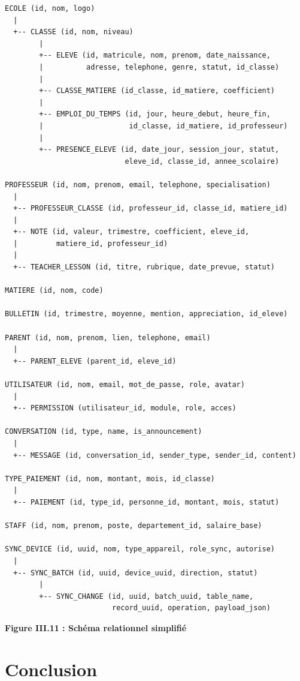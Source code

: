 \documentclass[12pt,a4paper,twoside]{report}
\begin{document}
\begin{verbatim}
ECOLE (id, nom, logo)
  |
  +-- CLASSE (id, nom, niveau)
        |
        +-- ELEVE (id, matricule, nom, prenom, date_naissance,
        |          adresse, telephone, genre, statut, id_classe)
        |
        +-- CLASSE_MATIERE (id_classe, id_matiere, coefficient)
        |
        +-- EMPLOI_DU_TEMPS (id, jour, heure_debut, heure_fin,
        |                    id_classe, id_matiere, id_professeur)
        |
        +-- PRESENCE_ELEVE (id, date_jour, session_jour, statut,
                            eleve_id, classe_id, annee_scolaire)

PROFESSEUR (id, nom, prenom, email, telephone, specialisation)
  |
  +-- PROFESSEUR_CLASSE (id, professeur_id, classe_id, matiere_id)
  |
  +-- NOTE (id, valeur, trimestre, coefficient, eleve_id,
  |         matiere_id, professeur_id)
  |
  +-- TEACHER_LESSON (id, titre, rubrique, date_prevue, statut)

MATIERE (id, nom, code)

BULLETIN (id, trimestre, moyenne, mention, appreciation, id_eleve)

PARENT (id, nom, prenom, lien, telephone, email)
  |
  +-- PARENT_ELEVE (parent_id, eleve_id)

UTILISATEUR (id, nom, email, mot_de_passe, role, avatar)
  |
  +-- PERMISSION (utilisateur_id, module, role, acces)

CONVERSATION (id, type, name, is_announcement)
  |
  +-- MESSAGE (id, conversation_id, sender_type, sender_id, content)

TYPE_PAIEMENT (id, nom, montant, mois, id_classe)
  |
  +-- PAIEMENT (id, type_id, personne_id, montant, mois, statut)

STAFF (id, nom, prenom, poste, departement_id, salaire_base)

SYNC_DEVICE (id, uuid, nom, type_appareil, role_sync, autorise)
  |
  +-- SYNC_BATCH (id, uuid, device_uuid, direction, statut)
        |
        +-- SYNC_CHANGE (id, uuid, batch_uuid, table_name,
                         record_uuid, operation, payload_json)
\end{verbatim}

\begin{center}
\textbf{Figure III.11 : Schéma relationnel simplifié}
\end{center}

\section{Conclusion}
\end{document}
